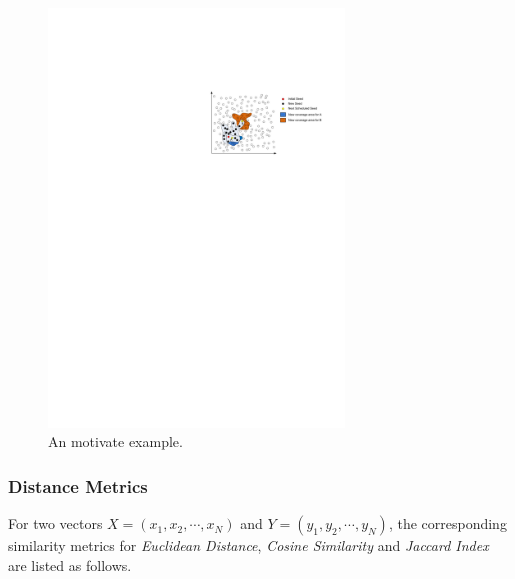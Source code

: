 \begin{figure}
\centering
\includegraphics[width=0.7\textwidth]{figures/motivate-example.pdf} 
\caption{An motivate example.}\label{motivate-example}
\end{figure}

\subsubsection{Distance Metrics}
For two vectors $\mathit{X} = (x_1, x_2, \cdots, x_N)$ and $\mathit{Y} = (y_1, y_2, \cdots, y_N)$, the corresponding similarity metrics for \textit{Euclidean Distance}, \textit{Cosine Similarity} and \textit{Jaccard Index} are listed as follows.

